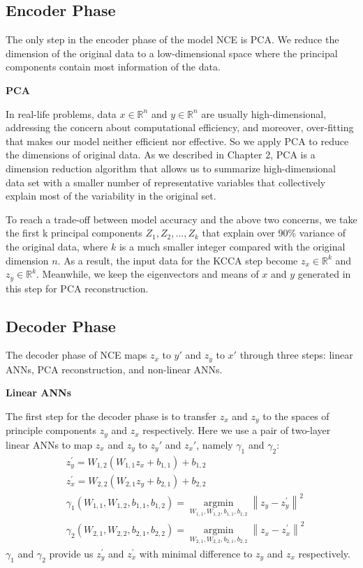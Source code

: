 \documentclass[12pt]{report} %
\newcommand{\norm}[1]{\left\lVert #1 \right\rVert}
\begin{document}
\subsection{Encoder Phase}
The only step in the encoder phase of the model NCE is PCA. We reduce the dimension of the original data to a low-dimensional space where the principal components contain most information of the data. 

\textbf{PCA}

In real-life problems, data $x\in \mathbb{R}^{n}$ and $y\in \mathbb{R}^{n}$ are usually high-dimensional, addressing the concern about computational efficiency, and moreover, over-fitting\cite{STAT} that makes our model neither efficient nor effective. So we apply PCA to reduce the dimensions of original data. As we described in Chapter 2, PCA is a dimension reduction algorithm that allows us to summarize high-dimensional data set with a smaller number of representative variables that collectively explain most of the variability in the original set.

To reach a trade-off between model accuracy and the above two concerns, we take the first k principal components \(Z_{1}, Z_{2},..., Z_{k}\) that explain over 90\% variance of the original data, where $k$ is a much smaller integer compared with the original dimension $n$. As a result, the input data for the KCCA step become $z_x\in \mathbb{R}^{k}$ and $z_y\in \mathbb{R}^{k}$. Meanwhile, we keep the eigenvectors and means of $x$ and $y$ generated in this step for PCA reconstruction.

\subsection{Decoder Phase}
The decoder phase of NCE maps $z_x$ to $y'$ and $z_y$ to $x'$ through three steps: linear ANNs, PCA reconstruction, and non-linear ANNs.

\textbf{Linear ANNs}

The first step for the decoder phase is to transfer $z_x$ and $z_y$ to the spaces of principle components $z_y$ and $z_x$ respectively. Here we use a pair of two-layer linear ANNs to map $z_x$ and $z_y$ to $z_y{'}$ and $z_x{'}$, namely $\gamma_1$ and $\gamma_2$:
\begin{equation}
\begin{split}
&z_y^{'}=W_{1,2}(W_{1,1}z_x+b_{1,1})+b_{1,2} \\
&z_x^{'}=W_{2,2}(W_{2,1}z_y+b_{2,1})+b_{2,2} \\
&\gamma_1(W_{1,1},W_{1,2},b_{1,1},b_{1,2})=\operatorname*{argmin}_{W_{1,1},W_{1,2},b_{1,1},b_{1,2}}\norm{z_y-z_y^{'}}^2 \\
&\gamma_2(W_{2,1},W_{2,2},b_{2,1},b_{2,2})=\operatorname*{argmin}_{W_{2,1},W_{2,2},b_{2,1},b_{2,2}}\norm{z_x-z_x^{'}}^2
\end{split}
\end{equation}
$\gamma_1$ and $\gamma_2$ provide us $z_y^{'}$ and $z_x^{'}$ with minimal difference to $z_y$ and $z_x$ respectively.
\end{document}
